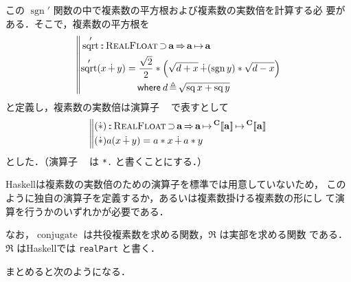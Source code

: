 \documentclass[a5paper,twoside,fleqn,draft]{jsbook}
\def\[{[\![}
\def\]{]\!]}
\DeclareMathOperator{\sgn}{sgn}
\newcommand{\programminglanguage}[1]{\textsf{#1}}
\newcommand{\haskell}{\programminglanguage{Haskell}}
\newcommand{\code}[1]{\texttt{#1}}
\newenvironment{haskellcode}{\begin{itembox}[r]{\haskell}}{\end{itembox}}
\newcommand{\mBrace}{\Vert}
\newcommand{\mKeyword}[1]{\mathsf{#1}}
\newcommand{\mWhereKeyword}{\mKeyword{where}}
\DeclareMathOperator{\mSuperClass}{\Rightarrow}
\DeclareMathOperator{\mSuperSet}{\supset}
\newcommand{\mSpecialFunc}[1]{#1}
\DeclareMathOperator{\mConjugate}{\mSpecialFunc{conjugate}}
\DeclareMathOperator{\mSq}{\mSpecialFunc{sq}}
\DeclareMathOperator{\mSqrt}{\mSpecialFunc{sqrt}}
\DeclareMathOperator{\mComplexPlus}{\dotplus}
\DeclareMathOperator{\mComplexTimes}{\Dot\ast}
\DeclareMathOperator{\mFuncArrow}{\mapsto}
\DeclareMathOperator{\mIn}{{:\!:}}
\DeclareMathOperator{\mLetEq}{\triangleq}
\newcommand{\mType}[1]{\mathbf{#1}} %
\newcommand{\mA}{\mType{a}}
\newcommand{\mTypeAssemble}[2]{{}^\mType{#1}\[\mType{#2}\]}
\newcommand{\mComplexType}[1]{\mTypeAssemble{C}{#1}}
\newcommand{\mTypeClass}[1]{\textsc{#1}} %
\newcommand{\mRealFloatTypeClass}{\mTypeClass{RealFloat}}
\newcommand{\mProjEXP}[2]{#1\mFuncArrow#2} %
\newcommand{\mWhereIsEXP}[2]{\mathbin{\mWhereKeyword}#1\mLetEq#2} %
\begin{document}
この $\sgn'$ 関数の中で複素数の平方根および複素数の実数倍を計算する必
要がある．そこで，複素数の平方根を
\begin{equation}
  \left\mBrace
  \begin{aligned}
    &\mSqrt'\mIn\mRealFloatTypeClass\mSuperSet\mA
    \mSuperClass\mProjEXP{\mA }{\mA }\\
    &\begin{aligned}
       \mSqrt'(x\mComplexPlus y)
       &=\frac{\sqrt{2}}{2}*\left(\sqrt{d+x}\mComplexPlus(\sgn y)*\sqrt{d-x}\right)\\
       &\quad\mWhereIsEXP{d}{\sqrt{\mSq x+\mSq y}}
     \end{aligned}
  \end{aligned}
  \right.
\end{equation}
と定義し，複素数の実数倍は演算子 $\mComplexTimes$ で表すとして
\begin{equation}
  \left\mBrace
  \begin{aligned}
    &(\mComplexTimes)\mIn\mRealFloatTypeClass\mSuperSet\mA \mSuperClass
    \mProjEXP{\mA }{\mProjEXP{\mComplexType{a}}{\mComplexType{a}}}\\
    &(\mComplexTimes)a(x\mComplexPlus y)=a*x\mComplexPlus a*y
  \end{aligned}
  \right.
\end{equation}
とした．（演算子 $\mComplexTimes$ は \code{*.} と書くことにする．）

\haskell は複素数の実数倍のための演算子を標準では用意していないため，
このように独自の演算子を定義するか，あるいは複素数掛ける複素数の形にし
て演算を行うかのいずれかが必要である．


なお，$\mConjugate$ は共役複素数を求める関数，$\Re$ は実部を求める関数
である．$\Re$ は\haskell では \code{realPart} と書く．

まとめると次のようになる．
\end{document}

